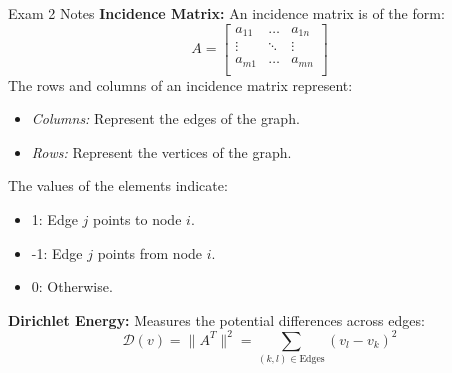 \begin{cheatsheet}{Exam 2 Notes}
    \textbf{Incidence Matrix:} An incidence matrix is of the form:
    \begin{equation*}
        A = 
        \begin{bmatrix}
            a_{11} & \dots & a_{1n} \\
            \vdots & \ddots & \vdots \\
            a_{m1} & \dots & a_{mn} \\
        \end{bmatrix}
    \end{equation*}
    The rows and columns of an incidence matrix represent:
    \begin{itemize}
        \item \textit{Columns:} Represent the edges of the graph.
        \item \textit{Rows:} Represent the vertices of the graph.
    \end{itemize}
    The values of the elements indicate:
    \begin{itemize}
        \item 1: Edge $j$ points to node $i$.
        \item -1: Edge $j$ points from node $i$.
        \item 0: Otherwise.
    \end{itemize}

    \textbf{Dirichlet Energy:} Measures the potential differences across edges:
    \begin{equation*}
        \mathcal{D}(v) = \|A^{T}\|^{2} = \sum_{(k,l) \in \text{Edges}} (v_{l} - v_{k})^{2}
    \end{equation*}


\end{cheatsheet}
